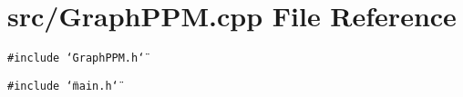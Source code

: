 \section{src/GraphPPM.cpp File Reference}
\label{GraphPPM_8cpp}
{\tt \#include \char`\"{}GraphPPM.h\char`\"{}}\par
{\tt \#include \char`\"{}main.h\char`\"{}}\par
